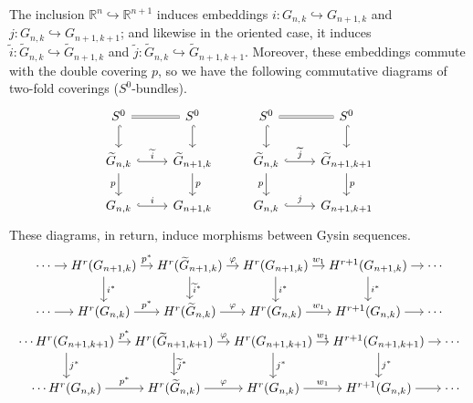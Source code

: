 \documentclass{amsart}
\theoremstyle{definition}
\theoremstyle{remark}
\numberwithin{equation}{section}
\begin{document}
The inclusion $\mathbb R^n\hookrightarrow\mathbb R^{n+1}$ induces embeddings $i:G_{n,k}\hookrightarrow G_{n+1,k}$ and $j:G_{n,k}\hookrightarrow G_{n+1,k+1}$; and likewise in the oriented case, it induces $\widetilde i:\widetilde G_{n,k}\hookrightarrow\widetilde G_{n+1,k}$ and $\widetilde j:\widetilde G_{n,k}\hookrightarrow\widetilde G_{n+1,k+1}$. Moreover, these embeddings commute with the double covering $p$, so we have the following commutative diagrams of two-fold coverings ($S^0$-bundles).
\[
\begin{tikzcd}
S^0
\arrow[equal]{r}
\arrow[hookrightarrow]{d}
&
S^0
\arrow[hookrightarrow]{d}
&
S^0
\arrow[equal]{r}
\arrow[hookrightarrow]{d}
&
S^0
\arrow[hookrightarrow]{d}
\\
\widetilde G_{n,k}
\arrow[hookrightarrow]{r}{\widetilde i}
\arrow{d}[left]{p}
&
\widetilde G_{n+1,k}
\arrow{d}{p}
&
\widetilde G_{n,k}
\arrow[hookrightarrow]{r}{\widetilde j}
\arrow{d}[left]{p}
&
\widetilde G_{n+1,k+1}
\arrow{d}{p}
\\
G_{n,k}
\arrow[hookrightarrow]{r}{i}
&
G_{n+1,k}
&
G_{n,k}
\arrow[hookrightarrow]{r}{j}
&
G_{n+1,k+1}
\end{tikzcd}
\]
These diagrams, in return, induce morphisms between Gysin sequences.
\begin{equation}\label{gysin1}
\begin{tikzcd}[column sep = 1em, font = \small, cramped]
\cdots
\arrow{r}
&
H^r(G_{n+1,k})
\arrow{r}{p^*}
\arrow{d}{i^*}
&
H^r(\widetilde G_{n+1,k})
\arrow{r}{\varphi}
\arrow{d}{\widetilde i^*}
&
H^r(G_{n+1,k})
\arrow{r}{w_1}
\arrow{d}{i^*}
&
H^{r+1}(G_{n+1,k})
\arrow{r}{}
\arrow{d}{i^*}
&
\cdots
\\
\cdots
\arrow{r}
&
H^r(G_{n,k})
\arrow{r}{p^*}
&
H^r(\widetilde G_{n,k})
\arrow{r}{\varphi}
&
H^r(G_{n,k})
\arrow{r}{w_1}
&
H^{r+1}(G_{n,k})
\arrow{r}
&
\cdots
\end{tikzcd}
\end{equation}
\begin{equation}\label{gysin2}
\begin{tikzcd}[column sep = 1em, font = \small, cramped]
\cdots
H^r(G_{n+1,k+1})
\arrow{r}{p^*}
\arrow{d}{j^*}
&
H^r(\widetilde G_{n+1,k+1})
\arrow{r}{\varphi}
\arrow{d}{\widetilde j^*}
&
H^r(G_{n+1,k+1})
\arrow{r}{w_1}
\arrow{d}{j^*}
&
H^{r+1}(G_{n+1,k+1})
\arrow{r}{}
\arrow{d}{j^*}
&
\cdots
\\
\cdots
H^r(G_{n,k})
\arrow{r}{p^*}
&
H^r(\widetilde G_{n,k})
\arrow{r}{\varphi}
&
H^r(G_{n,k})
\arrow{r}{w_1}
&
H^{r+1}(G_{n,k})
\arrow{r}
&
\cdots
\end{tikzcd}
\end{equation}
\end{document}
